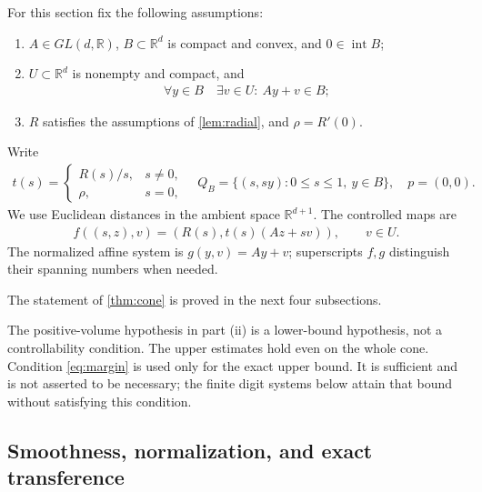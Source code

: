 \documentclass[11pt,a4paper]{article}
\theoremstyle{definition}
\theoremstyle{remark}
\begin{document}
For this section fix the following assumptions:
\begin{enumerate}
\item \(A\in GL(d,\mathbb R)\), \(B\subset\mathbb R^d\) is compact and convex, and \(0\in\operatorname{int} B\);
\item \(U\subset\mathbb R^d\) is nonempty and compact, and
\begin{align}\label{eq:viability}
 \forall y\in B\quad\exists v\in U:\ Ay+v\in B;
\end{align}
\item \(R\) satisfies the assumptions of \cref{lem:radial}, and \(\rho=R'(0)\).
\end{enumerate}
Write
\begin{align*}
 t(s)=
 \begin{cases}R(s)/s,&s\ne0,\\ \rho,&s=0,\end{cases}
 \quad
 Q_B=\{(s,sy):0\leq s\leq1,\ y\in B\},
 \quad p=(0,0).
\end{align*}
We use Euclidean distances in the ambient space \(\mathbb R^{d+1}\). The controlled maps are
\begin{align}\label{eq:cone-system}
 f((s,z),v)=(R(s),t(s)(Az+sv)),\qquad v\in U.
\end{align}
The normalized affine system is \(g(y,v)=Ay+v\); superscripts \(f,g\) distinguish their spanning numbers when needed.

The statement of \cref{thm:cone} is proved in the next four subsections.


The positive-volume hypothesis in part (ii) is a lower-bound hypothesis, not a controllability condition. The upper estimates hold even on the whole cone. Condition \eqref{eq:margin} is used only for the exact upper bound. It is sufficient and is not asserted to be necessary; the finite digit systems below attain that bound without satisfying this condition.

\subsection{Smoothness, normalization, and exact transference}
\end{document}
